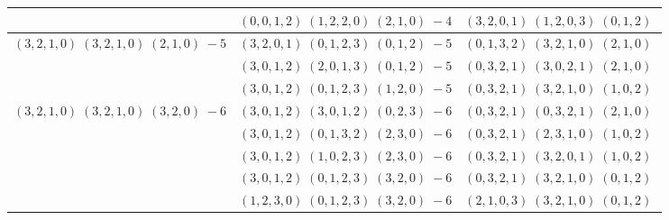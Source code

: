 \documentclass[11pt]{article}
\begin{document}
\begin{longtable}[l]{|c|c|c|}
 \cline{2-3} 
 & $(0 ,0 ,1 ,2) \;(1 ,2 ,2 ,0) \;(2 ,1 ,0) \;-4$ & $(3 ,2 ,0 ,1) \;(1 ,2 ,0 ,3) \;(0 ,1 ,2) \;$\\ \hline\multirow[t]{3}{*}{ $(3 ,2 ,1 ,0) \;(3 ,2 ,1 ,0) \;(2 ,1 ,0) \;-5$ }  & $(3 ,2 ,0 ,1) \;(0 ,1 ,2 ,3) \;(0 ,1 ,2) \;-5$ & $(0 ,1 ,3 ,2) \;(3 ,2 ,1 ,0) \;(2 ,1 ,0) \;$\\ 
 \cline{2-3} 
 & $(3 ,0 ,1 ,2) \;(2 ,0 ,1 ,3) \;(0 ,1 ,2) \;-5$ & $(0 ,3 ,2 ,1) \;(3 ,0 ,2 ,1) \;(2 ,1 ,0) \;$\\ 
 \cline{2-3} 
 & $(3 ,0 ,1 ,2) \;(0 ,1 ,2 ,3) \;(1 ,2 ,0) \;-5$ & $(0 ,3 ,2 ,1) \;(3 ,2 ,1 ,0) \;(1 ,0 ,2) \;$\\ \hline\multirow[t]{5}{*}{ $(3 ,2 ,1 ,0) \;(3 ,2 ,1 ,0) \;(3 ,2 ,0) \;-6$ }  & $(3 ,0 ,1 ,2) \;(3 ,0 ,1 ,2) \;(0 ,2 ,3) \;-6$ & $(0 ,3 ,2 ,1) \;(0 ,3 ,2 ,1) \;(2 ,1 ,0) \;$\\ 
 \cline{2-3} 
 & $(3 ,0 ,1 ,2) \;(0 ,1 ,3 ,2) \;(2 ,3 ,0) \;-6$ & $(0 ,3 ,2 ,1) \;(2 ,3 ,1 ,0) \;(1 ,0 ,2) \;$\\ 
 \cline{2-3} 
 & $(3 ,0 ,1 ,2) \;(1 ,0 ,2 ,3) \;(2 ,3 ,0) \;-6$ & $(0 ,3 ,2 ,1) \;(3 ,2 ,0 ,1) \;(1 ,0 ,2) \;$\\ 
 \cline{2-3} 
 & $(3 ,0 ,1 ,2) \;(0 ,1 ,2 ,3) \;(3 ,2 ,0) \;-6$ & $(0 ,3 ,2 ,1) \;(3 ,2 ,1 ,0) \;(0 ,1 ,2) \;$\\ 
 \cline{2-3} 
 & $(1 ,2 ,3 ,0) \;(0 ,1 ,2 ,3) \;(3 ,2 ,0) \;-6$ & $(2 ,1 ,0 ,3) \;(3 ,2 ,1 ,0) \;(0 ,1 ,2) \;$\\ \hline
  
 \end{longtable} 
 
\end{document}
